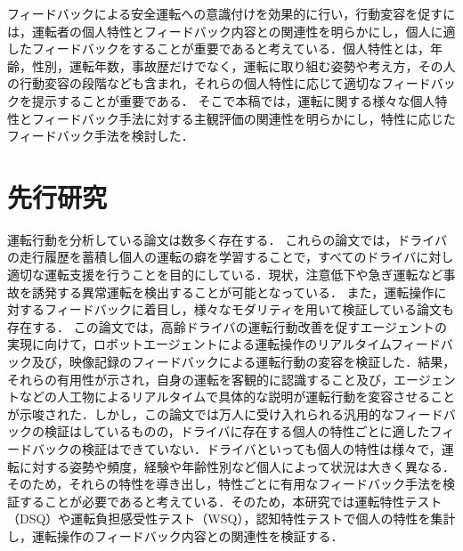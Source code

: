 \documentclass[twocolumn,a4j]{jarticle}
\begin{document}
フィードバックによる安全運転への意識付けを効果的に行い，行動変容を促すには，運転者の個人特性とフィードバック内容との関連性を明らかにし，個人に適したフィードバックをすることが重要であると考えている．個人特性とは，年齢，性別，運転年数，事故歴だけでなく，運転に取り組む姿勢や考え方，その人の行動変容の段階なども含まれ，それらの個人特性に応じて適切なフィードバックを提示することが重要である．
そこで本稿では，運転に関する様々な個人特性とフィードバック手法に対する主観評価の関連性を明らかにし，特性に応じたフィードバック手法を検討した．


\section{先行研究}
運転行動を分析している論文は数多く存在する\cite{tkt}\cite{ando}．
これらの論文では，ドライバの走行履歴を蓄積し個人の運転の癖を学習することで，すべてのドライバに対し適切な運転支援を行うことを目的にしている．現状，注意低下や急ぎ運転など事故を誘発する異常運転を検出することが可能となっている．
また，運転操作に対するフィードバックに着目し，様々なモダリティを用いて検証している論文も存在する\cite{agent}．
この論文では，高齢ドライバの運転行動改善を促すエージェントの実現に向けて，ロボットエージェントによる運転操作のリアルタイムフィードバック及び，映像記録のフィードバックによる運転行動の変容を検証した．結果，それらの有用性が示され，自身の運転を客観的に認識すること及び，エージェントなどの人工物によるリアルタイムで具体的な説明が運転行動を変容させることが示唆された．しかし，この論文では万人に受け入れられる汎用的なフィードバックの検証はしているものの，ドライバに存在する個人の特性ごとに適したフィードバックの検証はできていない．ドライバといっても個人の特性は様々で，運転に対する姿勢や頻度，経験や年齢性別など個人によって状況は大きく異なる．そのため，それらの特性を導き出し，特性ごとに有用なフィードバック手法を検証することが必要であると考えている．そのため，本研究では運転特性テスト（DSQ）や運転負担感受性テスト（WSQ）\cite{check}，認知特性テスト\cite{cog}で個人の特性を集計し，運転操作のフィードバック内容との関連性を検証する．
\end{document}
